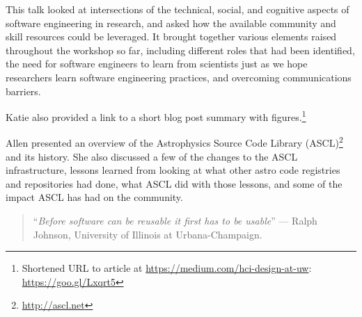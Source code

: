 \documentclass[a4paper,UKenglish]{dagrep}
\begin{document}

This talk looked at intersections of the technical, social, and cognitive aspects of software engineering in research, and asked how the available community and skill resources could be leveraged. It brought together various elements raised throughout the workshop so far, including different roles that had been identified, the need for software engineers to learn from scientists just as we hope researchers learn software engineering practices, and overcoming communications barriers.

Katie also provided a link to a short blog post summary with figures.\footnote{Shortened URL to article at \url{https://medium.com/hci-design-at-uw}: \url{https://goo.gl/Lxqrt5}}



Allen presented an overview of the Astrophysics Source Code Library (ASCL)\footnote{\url{http://ascl.net}} and its history.
She also discussed a few of the changes to the ASCL infrastructure, lessons learned from looking at what other astro code registries and repositories had done, what ASCL did with those lessons, and some of the impact ASCL has had on the community.


\begin{quote}
``\textit{Before software can be reusable it first has to be usable}'' --- Ralph Johnson, University of Illinois at Urbana-Champaign.
\end{quote}
\end{document}
